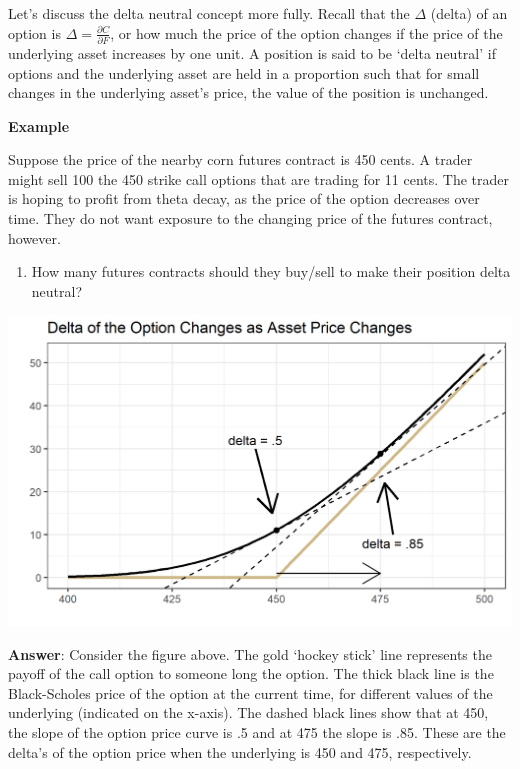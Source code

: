 \documentclass[
  letterpaper,
  DIV=11,
  numbers=noendperiod]{scrreprt}
\providecommand{\tightlist}{%
  \setlength{\itemsep}{0pt}\setlength{\parskip}{0pt}}\usepackage{longtable,booktabs,array}
\begin{document}
Let's discuss the delta neutral concept more fully. Recall that the
\(\Delta\) (delta) of an option is
\(\Delta = \frac{\partial C}{\partial F}\), or how much the price of the
option changes if the price of the underlying asset increases by one
unit. A position is said to be `delta neutral' if options and the
underlying asset are held in a proportion such that for small changes in
the underlying asset's price, the value of the position is unchanged.

\textbf{Example}

Suppose the price of the nearby corn futures contract is 450 cents. A
trader might sell 100 the 450 strike call options that are trading for
11 cents. The trader is hoping to profit from theta decay, as the price
of the option decreases over time. They do not want exposure to the
changing price of the futures contract, however.

\begin{enumerate}
\def\labelenumi{\arabic{enumi}.}
\tightlist
\item
  How many futures contracts should they buy/sell to make their position
  delta neutral?
\end{enumerate}

\includegraphics{assets/Options2-deltahedge.png}

\textbf{Answer}: Consider the figure above. The gold `hockey stick' line
represents the payoff of the call option to someone long the option. The
thick black line is the Black-Scholes price of the option at the current
time, for different values of the underlying (indicated on the x-axis).
The dashed black lines show that at 450, the slope of the option price
curve is .5 and at 475 the slope is .85. These are the delta's of the
option price when the underlying is 450 and 475, respectively.
\end{document}
